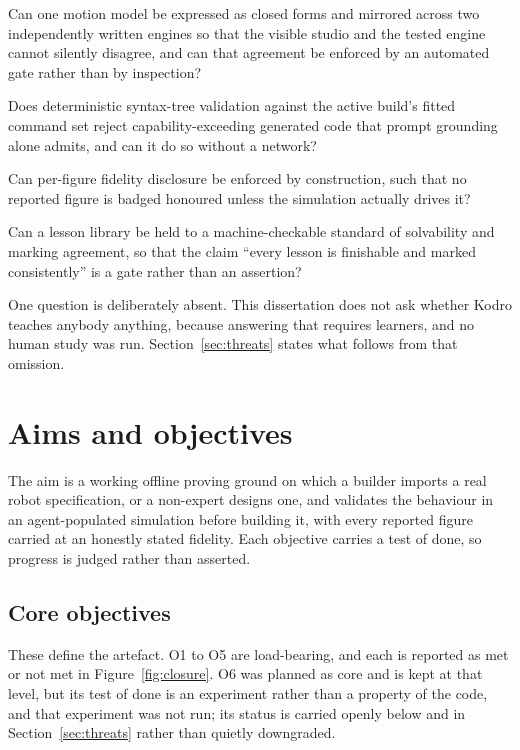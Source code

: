 \documentclass[11pt,a4paper]{report}
\begin{document}
\begin{description}[leftmargin=1.6cm,style=nextline]
\item[RQ1.] Can one motion model be expressed as closed forms and mirrored across two independently written engines so that the visible studio and the tested engine cannot silently disagree, and can that agreement be enforced by an automated gate rather than by inspection?
\item[RQ2.] Does deterministic syntax-tree validation against the active build's fitted command set reject capability-exceeding generated code that prompt grounding alone admits, and can it do so without a network?
\item[RQ3.] Can per-figure fidelity disclosure be enforced by construction, such that no reported figure is badged honoured unless the simulation actually drives it?
\item[RQ4.] Can a lesson library be held to a machine-checkable standard of solvability and marking agreement, so that the claim ``every lesson is finishable and marked consistently'' is a gate rather than an assertion?
\end{description}

 One question is deliberately absent. This dissertation does not ask whether Kodro teaches anybody anything, because answering that requires learners, and no human study was run. Section~\ref{sec:threats} states what follows from that omission.

\section{Aims and objectives}
The aim is a working offline proving ground on which a builder imports a real robot specification, or a non-expert designs one, and validates the behaviour in an agent-populated simulation before building it, with every reported figure carried at an honestly stated fidelity. Each objective carries a test of done, so progress is judged rather than asserted.

\subsection{Core objectives}
These define the artefact. O1 to O5 are load-bearing, and each is reported as met or not met in Figure~\ref{fig:closure}. O6 was planned as core and is kept at that level, but its test of done is an experiment rather than a property of the code, and that experiment was not run; its status is carried openly below and in Section~\ref{sec:threats} rather than quietly downgraded.
\end{document}

